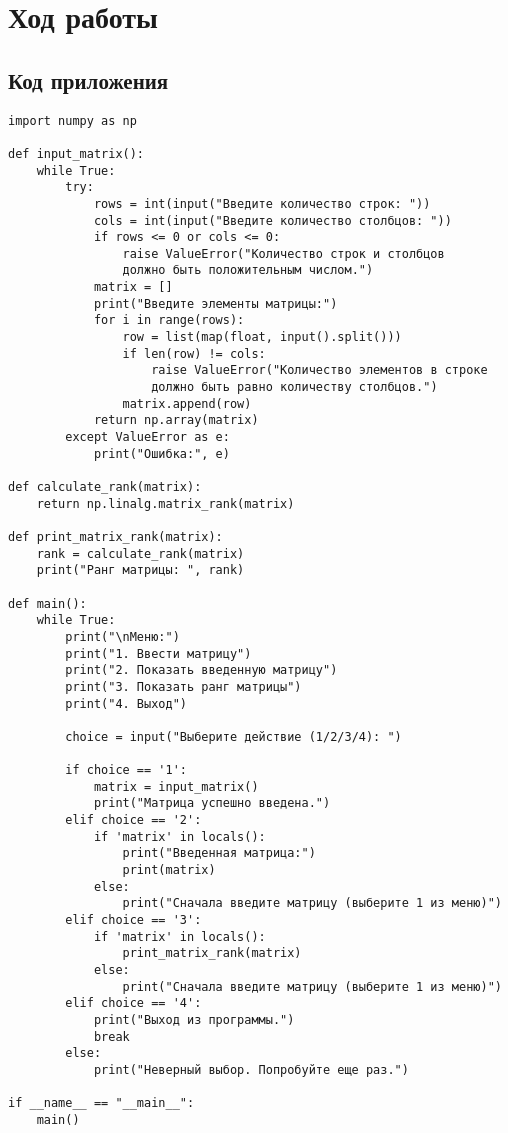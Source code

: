 \documentclass{article}
\begin{document}
\section{Ход работы}
\label{sec:exp}

\subsection{Код приложения}
\label{sec:exp:code}
\begin{verbatim}
import numpy as np

def input_matrix():
    while True:
        try:
            rows = int(input("Введите количество строк: "))
            cols = int(input("Введите количество столбцов: "))
            if rows <= 0 or cols <= 0:
                raise ValueError("Количество строк и столбцов
                должно быть положительным числом.")
            matrix = []
            print("Введите элементы матрицы:")
            for i in range(rows):
                row = list(map(float, input().split()))
                if len(row) != cols:
                    raise ValueError("Количество элементов в строке
                    должно быть равно количеству столбцов.")
                matrix.append(row)
            return np.array(matrix)
        except ValueError as e:
            print("Ошибка:", e)

def calculate_rank(matrix):
    return np.linalg.matrix_rank(matrix)

def print_matrix_rank(matrix):
    rank = calculate_rank(matrix)
    print("Ранг матрицы: ", rank)

def main():
    while True:
        print("\nМеню:")
        print("1. Ввести матрицу")
        print("2. Показать введенную матрицу")
        print("3. Показать ранг матрицы")
        print("4. Выход")

        choice = input("Выберите действие (1/2/3/4): ")

        if choice == '1':
            matrix = input_matrix()
            print("Матрица успешно введена.")
        elif choice == '2':
            if 'matrix' in locals():
                print("Введенная матрица:")
                print(matrix)
            else:
                print("Сначала введите матрицу (выберите 1 из меню)")
        elif choice == '3':
            if 'matrix' in locals():
                print_matrix_rank(matrix)
            else:
                print("Сначала введите матрицу (выберите 1 из меню)")
        elif choice == '4':
            print("Выход из программы.")
            break
        else:
            print("Неверный выбор. Попробуйте еще раз.")

if __name__ == "__main__":
    main()

\end{verbatim}
\end{document}
